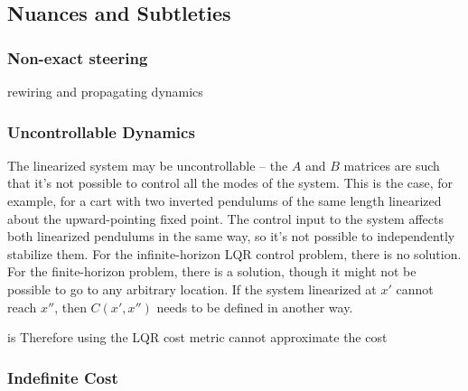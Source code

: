 \documentclass[letterpaper, 10pt, english, conference]{IEEEtran}
\begin{document}
\subsection{Nuances and Subtleties}


\subsubsection{Non-exact steering}

rewiring and propagating dynamics


\subsubsection{Uncontrollable Dynamics}

The linearized system may be uncontrollable -- the $A$ and $B$ matrices
are such that it's not possible to control all the modes of the system.
This is the case, for example, for a cart with two inverted pendulums
of the same length linearized about the upward-pointing fixed point.
The control input to the system affects both linearized pendulums
in the same way, so it's not possible to independently stabilize them.
For the infinite-horizon LQR control problem, there is no solution.
For the finite-horizon problem, there is a solution, though it might
not be possible to go to any arbitrary location. If the system linearized
at $x'$ cannot reach $x''$, then $C\left(x',x''\right)$ needs to
be defined in another way.

is Therefore using the LQR cost metric cannot approximate the cost 

\begin{comment}
Typical RTT{*} the cost metric is an underestimate of the true cost,
since the metric does not take into consideration obstacles. The true
cost, for example, might be infinite if there is no feasible path,
but the Euclidian metric will always be finite.

If the system is uncontrollable as is linearized by a single point,
then the LQR cost will be infinite while the true cost is not.
\end{comment}



\subsubsection{Indefinite Cost}
\end{document}
